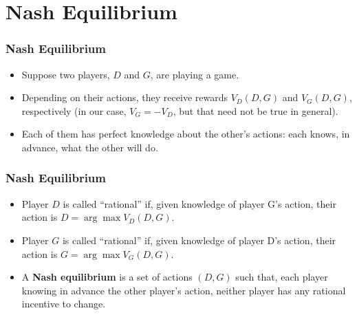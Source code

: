 \documentclass{beamer}
\begin{document}
\section{Nash Equilibrium}
\setcounter{subsection}{1}

\begin{frame}
  \frametitle{Nash Equilibrium}

  \begin{itemize}
  \item Suppose two players, $D$ and $G$, are playing a game.
  \item Depending on their actions, they receive rewards $V_D(D,G)$
    and $V_G(D,G)$, respectively (in our case, $V_G=-V_D$, but that
    need not be true in general).
  \item Each of them has perfect knowledge about the other's actions:
    each knows, in advance, what the other will do.
  \end{itemize}
\end{frame}
  
\begin{frame}
  \frametitle{Nash Equilibrium}

  \begin{itemize}
  \item Player $D$ is called ``rational'' if, given knowledge of player G's action,
    their action is $D = \arg\max V_D(D,G)$.
  \item Player $G$ is called ``rational'' if, given knowledge of player D's action,
    their action is $G = \arg\max V_G(D,G)$.
  \item A {\bf Nash equilibrium} is a set of actions $(D,G)$ such
    that, each player knowing in advance the other player's action,
    neither player has any rational incentive to change.
  \end{itemize}
\end{frame}
\end{document}

